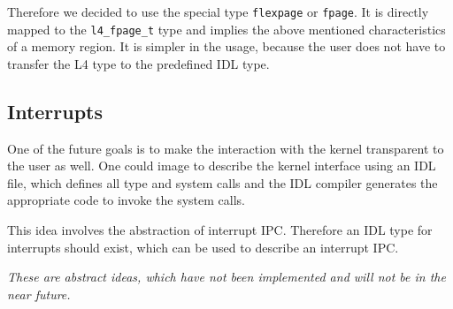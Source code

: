 Therefore we decided to use the special type \verb|flexpage| or
\verb|fpage|. It is directly mapped to the \verb|l4_fpage_t| type
and implies the above mentioned characteristics of a memory
region. It is simpler in the usage, because the user does
not have to transfer the L4 type to the predefined IDL type.


\subsection{Interrupts}
One of the future goals is to make the interaction with the
kernel transparent to the user as well. One could image to
describe the kernel interface using an IDL file, which defines
all type and system calls and the IDL compiler generates the
appropriate code to invoke the system calls.

This idea involves the abstraction of interrupt IPC. Therefore
an IDL type for interrupts should exist, which can be used to
describe an interrupt IPC.

{\it These are abstract ideas, which have not been implemented
and will not be in the near future.}

